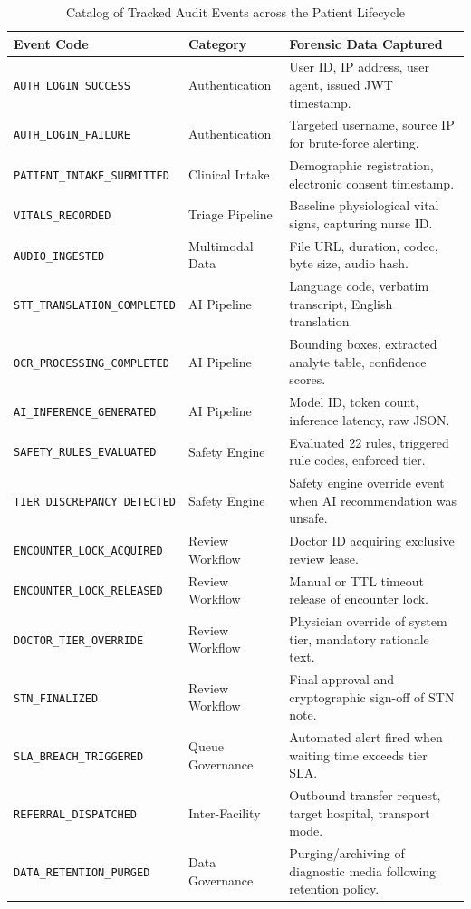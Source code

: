 \documentclass[11pt,a4paper,oneside]{report}
\begin{document}
\begin{table}[htbp]
  \centering
  \small
  \caption{Catalog of Tracked Audit Events across the Patient Lifecycle}
  \label{tab:audit_events}
  \begin{tabularx}{\textwidth}{p{4.2cm}p{2.6cm}X}
    \toprule
    \textbf{Event Code} & \textbf{Category} & \textbf{Forensic Data Captured} \\
    \midrule
    \texttt{AUTH\_LOGIN\_SUCCESS} & Authentication & User ID, IP address, user agent, issued JWT timestamp. \\
    \texttt{AUTH\_LOGIN\_FAILURE} & Authentication & Targeted username, source IP for brute-force alerting. \\
    \texttt{PATIENT\_INTAKE\_SUBMITTED} & Clinical Intake & Demographic registration, electronic consent timestamp. \\
    \texttt{VITALS\_RECORDED} & Triage Pipeline & Baseline physiological vital signs, capturing nurse ID. \\
    \texttt{AUDIO\_INGESTED} & Multimodal Data & File URL, duration, codec, byte size, audio hash. \\
    \texttt{STT\_TRANSLATION\_COMPLETED} & AI Pipeline & Language code, verbatim transcript, English translation. \\
    \texttt{OCR\_PROCESSING\_COMPLETED} & AI Pipeline & Bounding boxes, extracted analyte table, confidence scores. \\
    \texttt{AI\_INFERENCE\_GENERATED} & AI Pipeline & Model ID, token count, inference latency, raw JSON. \\
    \texttt{SAFETY\_RULES\_EVALUATED} & Safety Engine & Evaluated 22 rules, triggered rule codes, enforced tier. \\
    \texttt{TIER\_DISCREPANCY\_DETECTED} & Safety Engine & Safety engine override event when AI recommendation was unsafe. \\
    \texttt{ENCOUNTER\_LOCK\_ACQUIRED} & Review Workflow & Doctor ID acquiring exclusive review lease. \\
    \texttt{ENCOUNTER\_LOCK\_RELEASED} & Review Workflow & Manual or TTL timeout release of encounter lock. \\
    \texttt{DOCTOR\_TIER\_OVERRIDE} & Review Workflow & Physician override of system tier, mandatory rationale text. \\
    \texttt{STN\_FINALIZED} & Review Workflow & Final approval and cryptographic sign-off of STN note. \\
    \texttt{SLA\_BREACH\_TRIGGERED} & Queue Governance & Automated alert fired when waiting time exceeds tier SLA. \\
    \texttt{REFERRAL\_DISPATCHED} & Inter-Facility & Outbound transfer request, target hospital, transport mode. \\
    \texttt{DATA\_RETENTION\_PURGED} & Data Governance & Purging/archiving of diagnostic media following retention policy. \\
    \bottomrule
  \end{tabularx}
\end{table}
\end{document}
